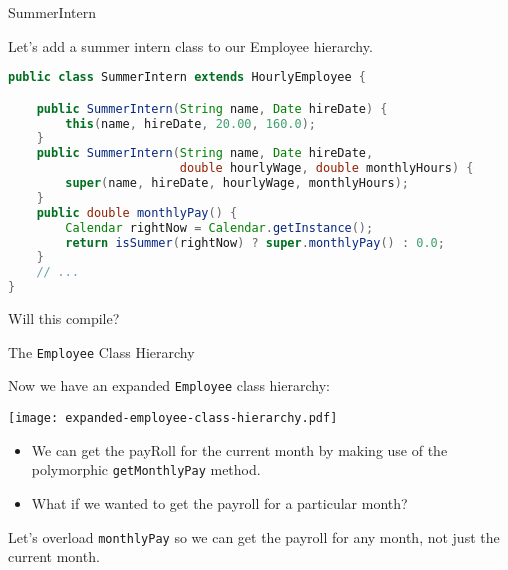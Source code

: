 \documentclass{beamer}
\author[Chris Simpkins] 
{Christopher Simpkins \\\texttt{chris.simpkins@gatech.edu}}
\institute[Georgia Tech] %
\date[CS 1331]{}
\begin{document}
\begin{frame}
  \titlepage
\end{frame}

\begin{frame}[fragile]{SummerIntern}


Let's add a summer intern class to our Employee hierarchy.
\begin{lstlisting}[language=Java]
public class SummerIntern extends HourlyEmployee {

    public SummerIntern(String name, Date hireDate) {
        this(name, hireDate, 20.00, 160.0);
    }
    public SummerIntern(String name, Date hireDate, 
                        double hourlyWage, double monthlyHours) {
        super(name, hireDate, hourlyWage, monthlyHours);
    }
    public double monthlyPay() {
        Calendar rightNow = Calendar.getInstance();
        return isSummer(rightNow) ? super.monthlyPay() : 0.0;
    }
    // ...
}
\end{lstlisting}

Will this compile?

\end{frame}


\begin{frame}[fragile]{The {\tt Employee} Class Hierarchy}


Now we have an expanded {\tt Employee} class hierarchy:
\vspace{-.1in}
\begin{center}
\texttt{[image: expanded-employee-class-hierarchy.pdf]}
\end{center}

\begin{itemize}
\item We can get the payRoll for the current month by making use of the polymorphic {\tt getMonthlyPay} method.
\item What if we wanted to get the payroll for a particular month?
\end{itemize}

Let's overload {\tt monthlyPay} so we can get the payroll for any month, not just the current month.

\end{frame}
\end{document}
